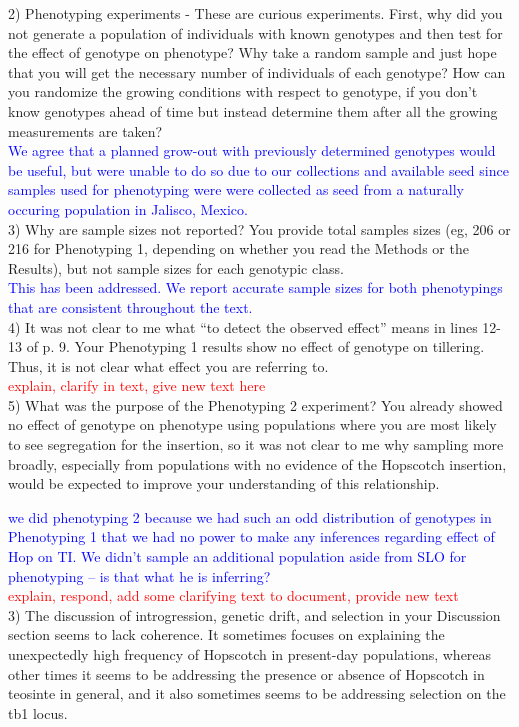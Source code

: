 \documentclass[11pt]{article}
\newcommand{\res}[1]{\noindent \textcolor{blue}{{#1}} \\}
\newcommand{\jri}[1]{\noindent \textcolor{red}{{#1}} \\}
\begin{document}
2) Phenotyping experiments - These are curious experiments.  First, why did you not generate a population of individuals with known genotypes and then test for the effect of genotype on phenotype?  Why take a random sample and just hope that you will get the necessary number of individuals of each genotype?  How can you randomize the growing conditions with respect to genotype, if you don’t know genotypes ahead of time but instead determine them after all the growing measurements are taken?\\

\res{We agree that a planned grow-out with previously determined genotypes would be useful, but were unable to do so due to our collections and available seed since samples used for phenotyping were were collected as seed from a naturally occuring population in Jalisco, Mexico.}

3) Why are sample sizes not reported?  You provide total samples sizes (eg, 206 or 216 for Phenotyping 1, depending on whether you read the Methods or the Results), but not sample sizes for each genotypic class.\\

\res{This has been addressed. We report accurate sample sizes for both phenotypings that are consistent throughout the text.}

4) It was not clear to me what “to detect the observed effect” means in lines 12-13 of p. 9.  Your Phenotyping 1 results show no effect of genotype on tillering.  Thus, it is not clear what effect you are referring to.\\

\jri{explain, clarify in text, give new text here}

5) What was the purpose of the Phenotyping 2  experiment?  You already showed no effect of genotype on phenotype using populations where you are most likely to see segregation for the insertion, so it was not clear to me why sampling more broadly, especially from populations with no evidence of the Hopscotch insertion, would be expected to improve your understanding of this relationship.

\res{we did phenotyping 2 because we had such an odd distribution of genotypes in Phenotyping 1 that we had no power to make any inferences regarding effect of Hop on TI. We didn't sample an additional population aside from SLO for phenotyping -- is that what he is inferring?} 
\jri{explain, respond, add some clarifying text to document, provide new text}

3) The discussion of introgression, genetic drift, and selection in your Discussion section seems to lack coherence.  It sometimes focuses on explaining the unexpectedly high frequency of Hopscotch in present-day populations, whereas other times it seems to be addressing the presence or absence of Hopscotch in teosinte in general, and it also sometimes seems to be addressing selection on the tb1 locus. 
\end{document}
